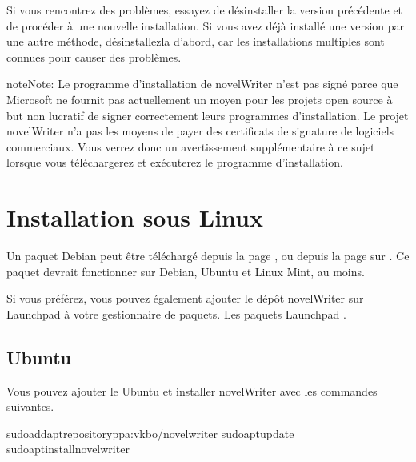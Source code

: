 \documentclass[a4paper,11pt,french]{sphinxmanual}
\begin{document}
\sphinxAtStartPar
Si vous rencontrez des problèmes, essayez de désinstaller la version précédente et de procéder à une nouvelle installation. Si vous avez déjà installé une version par une autre méthode, désinstallez\sphinxhyphen{}la d’abord, car les installations multiples sont connues pour causer des problèmes.

\begin{sphinxadmonition}{note}{Note:}
\sphinxAtStartPar
Le programme d’installation de novelWriter n’est pas signé parce que Microsoft ne fournit pas actuellement un moyen pour les projets open source à but non lucratif de signer correctement leurs programmes d’installation. Le projet novelWriter n’a pas les moyens de payer des certificats de signature de logiciels commerciaux. Vous verrez donc un avertissement supplémentaire à ce sujet lorsque vous téléchargerez et exécuterez le programme d’installation.
\end{sphinxadmonition}


\section{Installation sous Linux}
\label{\detokenize{int_started:installing-on-linux}}\label{\detokenize{int_started:a-started-linux}}
\sphinxAtStartPar
Un paquet Debian peut être téléchargé depuis la page , ou depuis la page  sur . Ce paquet devrait fonctionner sur Debian, Ubuntu et Linux Mint, au moins.

\sphinxAtStartPar
Si vous préférez, vous pouvez également ajouter le dépôt novelWriter sur Launchpad à votre gestionnaire de paquets. Les paquets Launchpad .


\subsection{Ubuntu}
\label{\detokenize{int_started:ubuntu}}
\sphinxAtStartPar
Vous pouvez ajouter le  Ubuntu et installer novelWriter avec les commandes suivantes.

\begin{sphinxVerbatim}[commandchars=\\\{\}]
sudoadd\PYGZhy{}apt\PYGZhy{}repositoryppa:vkbo/novelwriter
sudoaptupdate
sudoaptinstallnovelwriter
\end{sphinxVerbatim}
\end{document}
